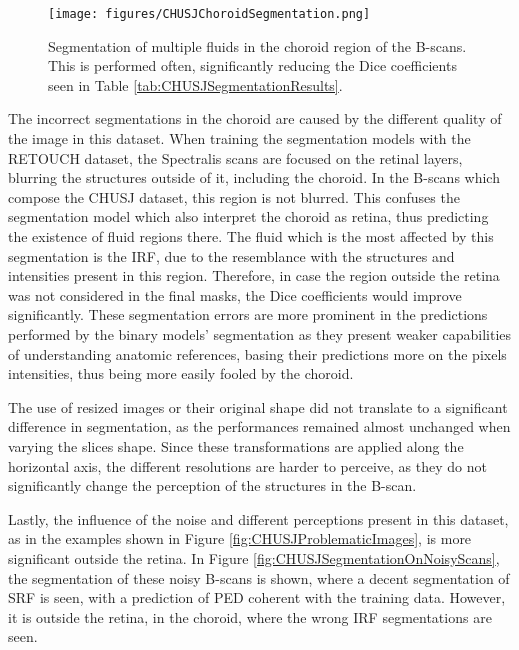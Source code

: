 \begin{figure}[!ht]
	\centering	\texttt{[image: figures/CHUSJChoroidSegmentation.png]}
	\caption{Segmentation of multiple fluids in the choroid region of the B-scans. This is performed often, significantly reducing the Dice coefficients seen in Table \ref{tab:CHUSJSegmentationResults}.}
	\label{fig:CHUSJChoroidSegmentation}
\end{figure}

The incorrect segmentations in the choroid are caused by the different quality of the image in this dataset. When training the segmentation models with the RETOUCH dataset, the Spectralis scans are focused on the retinal layers, blurring the structures outside of it, including the choroid. In the B-scans which compose the CHUSJ dataset, this region is not blurred. This confuses the segmentation model which also interpret the choroid as retina, thus predicting the existence of fluid regions there. The fluid which is the most affected by this segmentation is the IRF, due to the resemblance with the structures and intensities present in this region. Therefore, in case the region outside the retina was not considered in the final masks, the Dice coefficients would improve significantly. These segmentation errors are more prominent in the predictions performed by the binary models' segmentation as they present weaker capabilities of understanding anatomic references, basing their predictions more on the pixels intensities, thus being more easily fooled by the choroid.
\par
The use of resized images or their original shape did not translate to a significant difference in segmentation, as the performances remained almost unchanged when varying the slices shape. Since these transformations are applied along the horizontal axis, the different resolutions are harder to perceive, as they do not significantly change the perception of the structures in the B-scan.
\par
Lastly, the influence of the noise and different perceptions present in this dataset, as in the examples shown in Figure \ref{fig:CHUSJProblematicImages}, is more significant outside the retina. In Figure \ref{fig:CHUSJSegmentationOnNoisyScans}, the segmentation of these noisy B-scans is shown, where a decent segmentation of SRF is seen, with a prediction of PED coherent with the training data. However, it is outside the retina, in the choroid, where the wrong IRF segmentations are seen.

